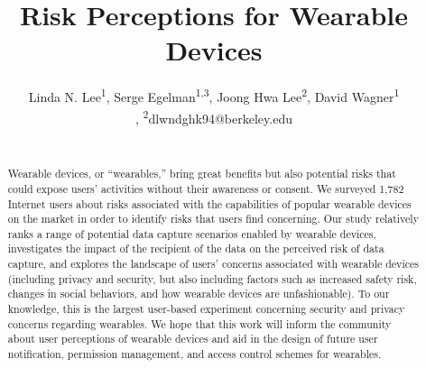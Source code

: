 \documentclass{sig-alternate-hotpets15}
\begin{document}
\title{Risk Perceptions for Wearable Devices}
\author{
 \alignauthor Linda N. Lee\textsuperscript{1}, Serge Egelman\textsuperscript{1,3}, Joong Hwa Lee\textsuperscript{2}, David Wagner\textsuperscript{1}\\
   \vspace{0.5em}
   , \textsuperscript{2}dlwndghk94@berkeley.edu\\
   \\
}


\maketitle


\begin{abstract}
\indent\indent Wearable devices, or ``wearables,'' bring great benefits but also potential risks that could expose users' activities without their awareness or consent. We surveyed 1,782 Internet users about risks associated with the capabilities of popular wearable devices on the market in order to identify risks that users find concerning. Our study relatively ranks a range of potential data capture scenarios enabled by wearable devices, investigates the impact of the recipient of the data on the perceived risk of data capture, and explores the landscape of users' concerns associated with wearable devices (including privacy and security, but also including factors such as increased safety risk, changes in social behaviors, and how wearable devices are unfashionable). To our knowledge, this is the largest user-based experiment concerning security and privacy concerns regarding wearables. We hope that this work will inform the community about user perceptions of wearable devices and aid in the design of future user notification, permission management, and access control schemes for wearables.
\end{abstract}



\end{document}
